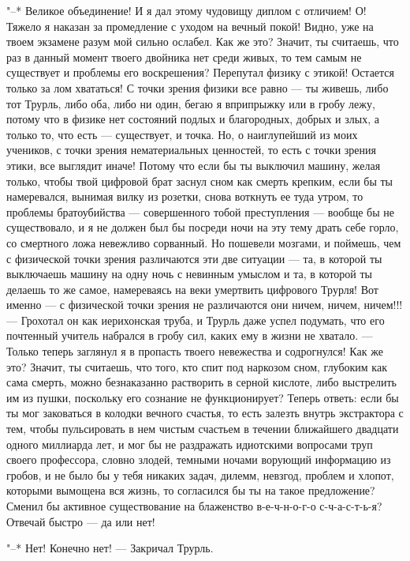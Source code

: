"--* Великое объединение! И я дал этому чудовищу диплом с
отличием! О! Тяжело я наказан за промедление с уходом на
вечный покой! Видно, уже на твоем экзамене разум мой сильно
ослабел. Как же это? Значит, ты считаешь, что раз в данный
момент твоего двойника нет среди живых, то тем самым не
существует и проблемы его воскрешения? Перепутал физику с
этикой! Остается только за лом хвататься! С точки зрения
физики все равно --- ты живешь, либо тот Трурль, либо оба,
либо ни один, бегаю я вприпрыжку или в гробу лежу, потому
что в физике нет состояний подлых и благородных, добрых и
злых, а только то, что есть --- существует, и точка. Но, о
наиглупейший из моих учеников, с точки зрения нематериальных
ценностей, то есть с точки зрения этики, все выглядит иначе!
Потому что если бы ты выключил машину, желая только, чтобы
твой цифровой брат заснул сном как смерть крепким, если бы
ты намеревался, вынимая вилку из розетки, снова воткнуть ее
туда утром, то проблемы братоубийства --- совершенного тобой
преступления --- вообще бы не существовало, и я не должен был
бы посреди ночи на эту тему драть себе горло, со смертного
ложа невежливо сорванный. Но пошевели мозгами, и поймешь,
чем с физической точки зрения различаются эти две ситуации --- та,
в которой ты выключаешь машину на одну ночь с невинным
умыслом и та, в которой ты делаешь то же самое, намереваясь
на веки умертвить цифрового Трурля! Вот именно --- с
физической точки зрения не различаются они ничем, ничем,
ничем!!! --- Грохотал он как иерихонская труба, и Трурль даже
успел подумать, что его почтенный учитель набрался в гробу
сил, каких ему в жизни не хватало. --- Только теперь заглянул
я в пропасть твоего невежества и содрогнулся! Как же это?
Значит, ты считаешь, что того, кто спит под наркозом сном,
глубоким как сама смерть, можно безнаказанно растворить в
серной кислоте, либо выстрелить им из пушки, поскольку его
сознание не функционирует? Теперь ответь: если бы ты мог
заковаться в колодки вечного счастья, то есть залезть внутрь
экстрактора с тем, чтобы пульсировать в нем чистым счастьем
в течении ближайшего двадцати одного миллиарда лет, и мог бы
не раздражать идиотскими вопросами труп своего профессора,
словно злодей, темными ночами ворующий информацию из гробов,
и не было бы у тебя никаких задач, дилемм, невзгод, проблем
и хлопот, которыми вымощена вся жизнь, то согласился бы ты
на такое предложение? Сменил бы активное существование на
блаженство в-е-ч-н-о-г-о с-ч-а-с-т-ь-я? Отвечай быстро --- да
или нет!

"--* Нет! Конечно нет! --- Закричал Трурль.

